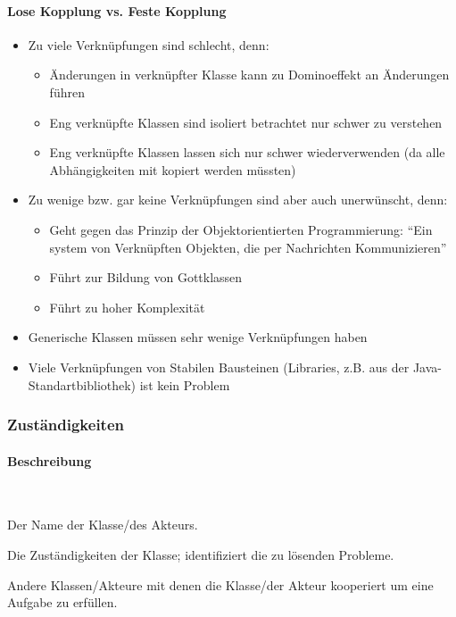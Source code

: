 \documentclass[ngerman,color=3b]{tuda_summary}
\begin{document}
\paragraph{Lose Kopplung vs. Feste Kopplung}
\begin{itemize}
    \item Zu viele Verknüpfungen sind schlecht, denn:\begin{itemize}
              \item Änderungen in verknüpfter Klasse kann zu Dominoeffekt an Änderungen führen
              \item Eng verknüpfte Klassen sind isoliert betrachtet nur schwer zu verstehen
              \item Eng verknüpfte Klassen lassen sich nur schwer wiederverwenden (da alle Abhängigkeiten mit kopiert werden müssten)
          \end{itemize}
    \item Zu wenige bzw. gar keine Verknüpfungen sind aber auch unerwünscht, denn:\begin{itemize}
              \item Geht gegen das Prinzip der Objektorientierten Programmierung: "`Ein system von Verknüpften Objekten, die per Nachrichten Kommunizieren"'
              \item Führt zur Bildung von Gottklassen
              \item Führt zu hoher Komplexität
          \end{itemize}
    \item Generische Klassen müssen sehr wenige Verknüpfungen haben
    \item Viele Verknüpfungen von Stabilen Bausteinen (Libraries, z.B. aus der Java-Standartbibliothek) ist kein Problem
\end{itemize}
\clearpage
\subsubsection{Zuständigkeiten}

\paragraph{Beschreibung}\mbox{}\\
\begin{description}[leftmargin = 3cm]
    \item[Class] Der Name der Klasse/des Akteurs.
    \item[Responsibilities] Die Zuständigkeiten der Klasse; identifiziert die zu lösenden Probleme.
    \item[Collaborations] Andere Klassen/Akteure mit denen die Klasse/der Akteur kooperiert um eine Aufgabe zu erfüllen.
\end{description}
\end{document}
